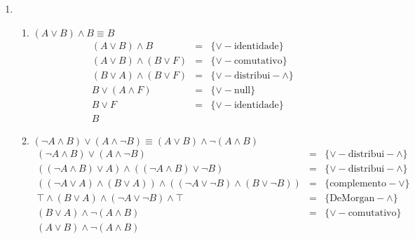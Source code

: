 \begin{enumerate}
	\item
	\begin{enumerate}
		
			\item $(A\lor B)\land B\equiv B$
			\[
				\begin{array}{lcl}
					(A \lor B)\land B & = & \{\lor-\text{identidade}\} \\
					(A \lor B) \land (B \lor F) & = & \{\lor-\text{comutativo}\}\\
					(B \lor A) \land (B \lor F) & = & \{\lor-\text{distribui}-\land\}\\
					B \lor (A \land F) & = & \{\lor-\text{null}\}\\
					B \lor F & = & \{\lor-\text{identidade}\}\\
					B & &	
				\end{array}
			\]
			\item $(\neg A\land B)\lor (A\land\neg B)\equiv (A\lor B)\land \neg (A\land B)$
			\[
				\begin{array}{lcl}
					(\neg A\land B)\lor (A\land\neg B) & = & \{\lor-\text{distribui}-\land\}\\
					((\neg A \land B)\lor A) \land ((\neg A \land B) \lor \neg B) & = & \{\lor-\text{distribui}-\land\}\\
					((\neg A \lor A)\land(B \lor A)) \land ((\neg A \lor \neg B) \land (B \lor \neg B)) & = & \{\text{complemento}-\lor\}\\
					\top \land (B \lor A) \land (\neg A \lor \neg B) \land \top & = & \{\text{DeMorgan}-\land\}\\
					(B \lor A) \land \neg(A \land B) & = & \{\lor-\text{comutativo}\}\\
					(A \lor B) \land \neg(A \land B) & &
					
				\end{array}
			\]
			

\end{enumerate}
\end{enumerate}
